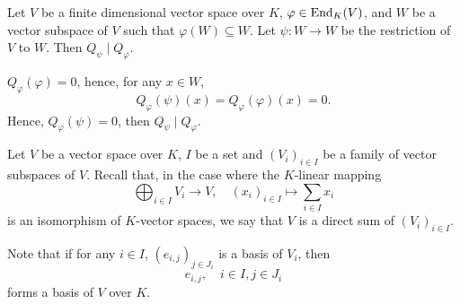 \begin{propositionenv}\label{prop:6.3.2}
    Let $V$ be a finite dimensional vector space over $K$,
    $\varphi \in \operatorname{\mathrm{End}}_{K}(V)$,
    and $W$ be a vector subspace of $V$ such that $\varphi(W) \subseteq W$.
    Let $\psi : W \rightarrow W$ be the restriction of $V$ to $W$.
    Then $Q_{\psi} \mid Q_{\varphi}$.
\end{propositionenv}
\begin{proofenv}
    $Q_{\varphi}(\varphi) = 0$, hence, for any $x \in W$,
    $$Q_{\varphi}(\psi)(x) = Q_{\varphi}(\varphi)(x) = 0.$$
    Hence, $Q_{\varphi}(\psi) = 0$, then $Q_{\psi} \mid Q_{\varphi}$.
\end{proofenv}

\begin{definitionenv}\label{def:6.3.3}
    Let $V$ be a vector space over $K$,
    $I$ be a set and $(V_i)_{i \in I}$ be a family of vector subspaces of $V$.
    Recall that, in the case where the $K$-linear mapping
    $$ \bigoplus_{i \in I} V_i \longrightarrow V, \quad (x_i)_{i \in I} \longmapsto \sum_{i \in I} x_i$$
    is an isomorphism of $K$-vector spaces, we say that $V$ is a direct sum of $(V_i)_{i \in I}$.
    
    \quad Note that if for any $i \in I$, $(e_{i,j})_{j \in J_i}$ is a basis of $V_i$, then
    $$e_{i,j}, \quad i \in I, j \in J_i$$
    forms a basis of $V$ over $K$.
\end{definitionenv}

